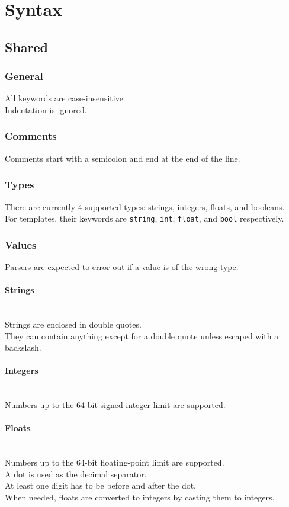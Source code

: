 \documentclass[12pt]{article}
\let\oldparagraph\paragraph
\renewcommand{\paragraph}[1]{\oldparagraph{#1}\mbox{}\\}
\begin{document}
    \newpage

    \section{Syntax}
    \subsection{Shared}

    \subsubsection{General}
    All keywords are case-insensitive. \\
    Indentation is ignored.

    \subsubsection{Comments}
    Comments start with a semicolon and end at the end of the line.

    \subsubsection{Types}
    There are currently 4 supported types: strings, integers, floats, and booleans. \\
    For templates, their keywords are \texttt{string}, \texttt{int}, \texttt{float}, and \texttt{bool} respectively.

    \subsubsection{Values}
    Parsers are expected to error out if a value is of the wrong type.
   
    \paragraph{Strings}
    Strings are enclosed in double quotes. \\
    They can contain anything except for a double quote unless escaped with a backslash.

    \paragraph{Integers}
    Numbers up to the 64-bit signed integer limit are supported.

    \paragraph{Floats}
    Numbers up to the 64-bit floating-point limit are supported. \\
    A dot is used as the decimal separator. \\
    At least one digit has to be before and after the dot. \\
    When needed, floats are converted to integers by casting them to integers.
\end{document}
